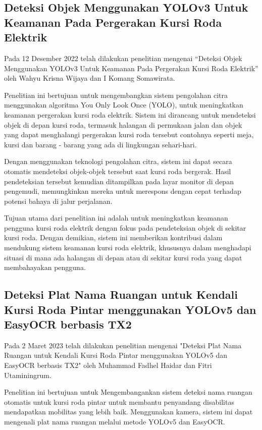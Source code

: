 \subsection{Deteksi Objek Menggunakan YOLOv3 Untuk Keamanan Pada Pergerakan Kursi Roda Elektrik}
\label{p}

Pada 12 Desember 2022 telah dilakukan penelitian mengenai “Deteksi Objek Menggunakan YOLOv3 Untuk Keamanan Pada Pergerakan Kursi Roda Elektrik”  oleh Wahyu Krisna Wijaya dan I Komang Somawirata. \parencite{wijaya2022deteksi}

Penelitian ini bertujuan untuk mengembangkan sistem pengolahan citra menggunakan algoritma You Only Look Once (YOLO), untuk meningkatkan keamanan pergerakan kursi roda elektrik. Sistem ini dirancang untuk mendeteksi objek di depan kursi roda, termasuk halangan di permukaan jalan dan objek yang dapat menghalangi pergerakan kursi roda tersebut contohnya seperti meja, kursi dan barang - barang yang ada di lingkungan sehari-hari.

Dengan menggunakan teknologi pengolahan citra, sistem ini dapat secara otomatis mendeteksi objek-objek tersebut saat kursi roda bergerak. Hasil pendeteksian tersebut kemudian ditampilkan pada layar monitor di depan pengemudi, memungkinkan mereka untuk merespons dengan cepat terhadap potensi bahaya di jalur perjalanan.

Tujuan utama dari penelitian ini adalah untuk meningkatkan keamanan pengguna kursi roda elektrik dengan fokus pada pendeteksian objek di sekitar kursi roda. Dengan demikian, sistem ini memberikan kontribusi dalam mendukung sistem keamanan kursi roda elektrik, khususnya dalam menghadapi situasi di mana ada halangan di depan atau di sekitar kursi roda yang dapat membahayakan pengguna.

\subsection{Deteksi Plat Nama Ruangan untuk Kendali Kursi Roda Pintar menggunakan YOLOv5 dan EasyOCR berbasis TX2}

Pada 2 Maret 2023 telah dilakukan penelitian mengenai "Deteksi Plat Nama Ruangan untuk Kendali Kursi Roda Pintar menggunakan YOLOv5 dan EasyOCR berbasis TX2" oleh Muhammad Fadhel Haidar dan Fitri Utaminingrum.

Penelitian ini bertujuan untuk Mengembangankan sistem deteksi nama ruangan otomatis untuk kursi roda pintar untuk membantu penyandang disabilitas mendapatkan mobilitas yang lebih baik. Menggunakan kamera, sistem ini dapat mengenali plat nama ruangan melalui metode YOLOv5 dan EasyOCR.

